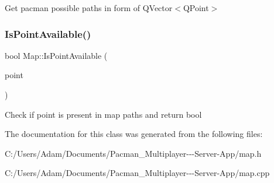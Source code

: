 Get pacman possible paths in form of Q\+Vector$<$\+Q\+Point$>$ \mbox{\label{class_map_a1d4e431479ebaab122888188e12b912f}} 
\subsubsection{\texorpdfstring{Is\+Point\+Available()}{IsPointAvailable()}}
{\footnotesize\ttfamily bool Map\+::\+Is\+Point\+Available (\begin{DoxyParamCaption}\item[{Q\+Point}]{point }\end{DoxyParamCaption})}

Check if point is present in map paths and return bool 

The documentation for this class was generated from the following files\+:\begin{DoxyCompactItemize}
\item 
C\+:/\+Users/\+Adam/\+Documents/\+Pacman\+\_\+\+Multiplayer-\/-\/-\/\+Server-\/\+App/map.\+h\item 
C\+:/\+Users/\+Adam/\+Documents/\+Pacman\+\_\+\+Multiplayer-\/-\/-\/\+Server-\/\+App/map.\+cpp\end{DoxyCompactItemize}
